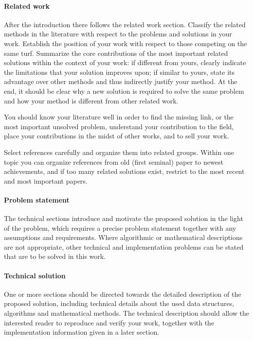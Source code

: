 \documentclass[11pt, a4paper,oneside,chapterprefix=false]{scrbook}
\begin{document}
\paragraph{Related work}
After the introduction there follows the related work section. Classify the related methods in the literature with respect to the problems and solutions in your work. Establish the position of your work with respect to those competing on the same turf. Summarize the core contributions of the most important related  solutions within the context of your work: if different from yours, clearly indicate the limitations that your solution improves upon; if similar to yours, state its advantage over other methods and thus indirectly justify your method. At the end, it should be clear why a new solution is required to solve the same problem and how your method is different from other related work.

You should know your literature well in order to find the missing link, or the most important unsolved problem, understand your contribution to the field, place your contributions in the midst of other works, and to sell your work.

Select references carefully and organize them into related groups. Within one topic you can organize references from old (first seminal) paper to newest achievements, and if too many related solutions exist, restrict to the most recent and most important papers.

\paragraph{Problem statement}

The technical sections introduce and motivate the proposed solution in the light of the problem, which requires a precise problem statement together with any assumptions and requirements. Where algorithmic or mathematical descriptions are not appropriate, other technical and implementation problems can be stated that are to be solved in this work.

\paragraph{Technical solution}

One or more sections should be directed towards the detailed description of the proposed solution, including technical details about the used data structures, algorithms and mathematical methods. The technical description should allow the interested reader to reproduce and verify your work, together with the implementation information given in a later section.
\end{document}
